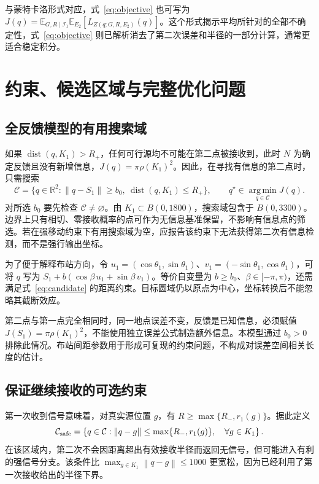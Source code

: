 \documentclass[UTF8,a4paper,zihao=-4,fontset=none]{ctexart}
\numberwithin{equation}{section}
\theoremstyle{definition}
\newcommand{\R}{\mathbb R}
\newcommand{\E}{\mathbb E}
\newcommand{\norm}[1]{\left\lVert #1\right\rVert}
\newcommand{\dist}{\operatorname{dist}}
\newcommand{\argmin}{\operatorname*{arg\,min}}
\begin{document}
与蒙特卡洛形式对应，式~\eqref{eq:objective} 也可写为 \(J(q)=\E_{G,R\mid\mathcal I_1}\E_{E_2}[L_{Z(q;G,R,E_2)}(q)]\)。这个形式揭示平均所针对的全部不确定性，式~\eqref{eq:objective} 则已解析消去了第二次误差和半径的一部分计算，通常更适合稳定积分。

\section{约束、候选区域与完整优化问题}
\subsection{全反馈模型的有用搜索域}
如果 \(\dist(q,K_1)>R_+\)，任何可行源均不可能在第二点被接收到，此时 \(N\) 为确定反馈且没有新增信息，\(J(q)=\pi\rho(K_1)^2\)。因此，在寻找有信息的第二点时，只需搜索
\begin{equation}\label{eq:candidate}
\mathcal C=\{q\in\R^2:\norm{q-S_1}\ge b_0,\ \dist(q,K_1)\le R_+\},
\qquad
\boxed{q^\star\in\argmin_{q\in\mathcal C}J(q).}
\end{equation}
对所选 \(b_0\) 要先检查 \(\mathcal C\ne\varnothing\)。由 \(K_1\subset B(0,1800)\)，搜索域包含于 \(B(0,3300)\)。边界上只有相切、零接收概率的点可作为无信息基准保留，不影响有信息点的筛选。若在强移动约束下有用搜索域为空，应报告该约束下无法获得第二次有信息检测，而不是强行输出坐标。

为了便于解释布站方向，令 \(u_1=(\cos\theta_1,\sin\theta_1)\)、\(v_1=(-\sin\theta_1,\cos\theta_1)\)，可将 \(q\) 写为 \(S_1+b(\cos\beta\,u_1+\sin\beta\,v_1)\)。等价自变量为 \(b\ge b_0\)、\(\beta\in[-\pi,\pi)\)，还需满足式~\eqref{eq:candidate} 的距离约束。目标圆域仍以原点为中心，坐标转换后不能忽略其截断效应。

第二点与第一点完全相同时，同一地点误差不变，反馈是已知信息，必须赋值 \(J(S_1)=\pi\rho(K_1)^2\)，不能使用独立误差公式制造额外信息。本模型通过 \(b_0>0\) 排除此情况。布站间距参数用于形成可复现的约束问题，不构成对误差空间相关长度的估计。

\subsection{保证继续接收的可选约束}
第一次收到信号意味着，对真实源位置 \(g\)，有 \(R\ge\max\{R_-,r_1(g)\}\)。据此定义
\begin{equation}\label{eq:csafe}
\mathcal C_{\rm safe}=\left\{q\in\mathcal C:
\norm{q-g}\le\max\{R_-,r_1(g)\},\quad\forall g\in K_1\right\}.
\end{equation}
在该区域内，第二次不会因距离超出有效接收半径而返回无信号，但可能进入有利的强信号分支。该条件比 \(\max_{g\in K_1}\norm{q-g}\le1000\) 更宽松，因为已经利用了第一次接收给出的半径下界。
\end{document}
